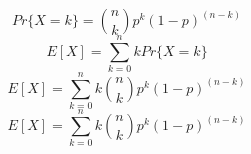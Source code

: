 \documentclass{article}
\begin{document}
	\begin{equation}
	Pr\{X = k\} = {n \choose k} p^k (1 - p)^{(n - k)}
	\end{equation}
	\begin{equation}
	E[X] = \sum_{k = 0}^{n} k Pr\{X = k\}
	\end{equation}
	\begin{equation}
	E[X] = \sum_{k = 0}^{n} k {n \choose k} p^k (1 - p)^{(n - k)}
	\end{equation}
	\begin{equation}
	E[X] = \sum_{k = 0}^{n} k {n \choose k} p^k (1 - p)^{(n - k)}
	\end{equation}
\end{document}
